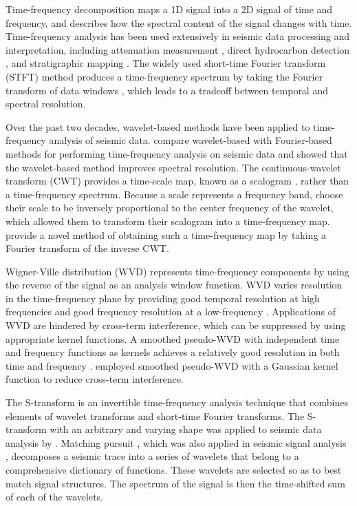 Time-frequency decomposition maps a 1D signal into a 2D signal
of time and frequency, and describes how the spectral content of the
signal changes with time. Time-frequency analysis has been used
extensively in seismic data processing and interpretation, including
attenuation measurement  \cite[]{Reine2009}, direct hydrocarbon
detection \cite[]{Castagna2003}, and stratigraphic mapping
\cite[]{Partyka1999}. The widely used short-time Fourier transform
(STFT) method produces a time-frequency spectrum by taking the
Fourier transform of data windows \cite[]{Cohen1995}, which leads to a
tradeoff between temporal and spectral resolution.

Over the past two decades, wavelet-based methods have been
applied to time-frequency analysis of seismic data.  \cite{Chakraborty1995} 
compare wavelet-based with Fourier-based methods
for performing time-frequency analysis on seismic data and
showed that the wavelet-based method improves spectral resolution.
The continuous-wavelet transform (CWT) provides a time-scale
map, known as a scalogram \cite[]{Rioul1991}, rather than
a time-frequency spectrum. Because a scale represents a frequency
band, \cite{Hlawatsch1992} choose their scale
to be inversely proportional to the center frequency of the wavelet,
which allowed them to transform their scalogram into a time-frequency
map. \cite{Sinha2005} provide a novel method of obtaining
such a time-frequency map by taking a Fourier transform of
the inverse CWT.

Wigner-Ville distribution (WVD) \cite[]{Wigner1932} represents
time-frequency components by using the reverse of the signal as
an analysis window function. WVD varies resolution in the
time-frequency plane by providing good temporal resolution at high
frequencies and good frequency resolution at a low-frequency
\cite[]{Cohen1989}. Applications of WVD are hindered by cross-term
interference, which can be suppressed by using appropriate kernel
functions. A smoothed pseudo-WVD with independent time and
frequency functions as kernels achieves a relatively good resolution
in both time and frequency \cite[]{Li2008}. \cite{Wu2009} employed 
smoothed pseudo-WVD with a Gaussian kernel
function to reduce cross-term interference.

The S-transform is an invertible time-frequency analysis technique
that combines elements of wavelet transforms and short-time
Fourier transforms. The S-transform with an arbitrary and varying
shape was applied to seismic data analysis by \cite{Pinnegar2003}. 
Matching pursuit \cite[]{Mallat1993},
which was also applied in seismic signal analysis \cite[]{Chakraborty1995, Castagna2003, Liu2004, 
Liu2005, Wang2007}, decomposes a seismic trace into
a series of wavelets that belong to a comprehensive dictionary of
functions. These wavelets are selected so as to best match signal
structures. The spectrum of the signal is then the time-shifted
sum of each of the wavelets.

